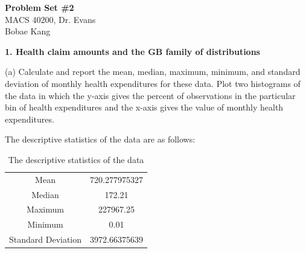 \documentclass[letterpaper,12pt]{article}
\theoremstyle{definition}
\begin{document}
\begin{flushleft}
  \textbf{\large{Problem Set \#2}} \\
  MACS 40200, Dr. Evans \\
  Bobae Kang
\end{flushleft}

\vspace{5mm}

\noindent\textbf{1. Health claim amounts and the GB family of distributions}
\par
\noindent(a) Calculate and report the mean, median, maximum, minimum, and standard deviation of monthly health expenditures for these data. Plot two histograms of the data in which the y-axis gives the percent of observations in the particular bin of health expenditures and the x-axis gives the value of monthly health expenditures.
\par\bigskip

The descriptive statistics of the data are as follows:
\begin{table}[h!]
 \centering
 \caption{The descriptive statistics of the data }
 \begin{tabular}{|c | c |} 
  \hline
  Mean &  720.277975327\\ 
  Median &  172.21\\ 
  Maximum &  227967.25\\ 
  Minimum &  0.01\\ 
  Standard Deviation &  3972.66375639\\ 
  \hline
  \end{tabular}
\end{table}
\par
\end{document}
